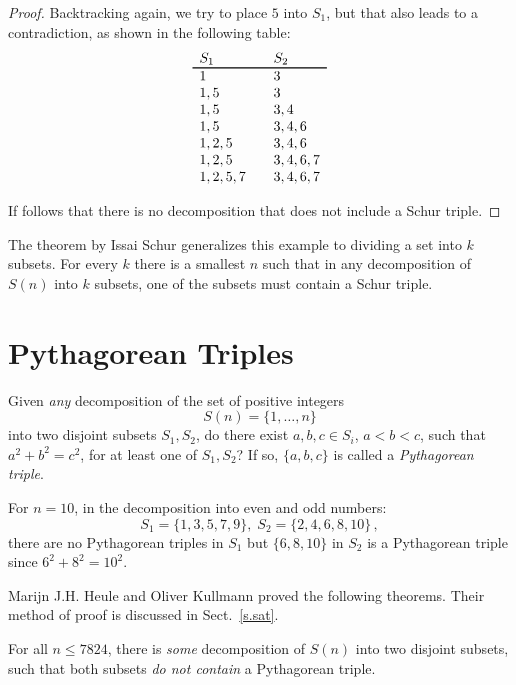 \begin{proof}
Backtracking again, we try to place $5$ into $S_1$, but that also leads to a contradiction, as shown in the following table:
\[
\begin{array}{l@{\hspace{2em}}l}
S_1&S_2\\\svhline
1&3\\
1,5& 3\\
1,5&3,4\\
1,5&3,4,6\\
1,2,5&3,4,6\\
1,2,5&3,4,6,7\\
1,2,5,7&3,4,6,7
\end{array}
\]

If follows that there is no decomposition that does not include a Schur triple.
\end{proof}

The theorem by Issai Schur generalizes this example to dividing a set into $k$ subsets. For every $k$ there is a smallest $n$ such that in any decomposition of $S(n)$ into $k$ subsets, one of the subsets must contain a Schur triple.


\section{Pythagorean Triples}\label{s.pyth}

\begin{definition}
Given \emph{any} decomposition of the set of positive integers
\[S(n)=\{1,\ldots,n\}\]
into two disjoint subsets $S_1,S_2$, do there exist $a,b,c\in S_i$, $a\!<\!b\!<\!c$, such that $a^2+b^2=c^2$, for at least one of $S_1,S_2$? If so, $\{a,b,c\}$ is called a \emph{Pythagorean triple}.
\end{definition}

\begin{example}
For $n=10$, in the decomposition into even and odd numbers:
\[
S_1 = \{1,3,5,7,9\},\; S_2=\{2,4,6,8,10\}\,,
\]
there are no Pythagorean triples in $S_1$ but $\{6,8,10\}$ in $S_2$ is a Pythagorean triple since $6^2+8^2=10^2$.
\end{example}

Marijn J.H. Heule and Oliver Kullmann proved the following theorems. Their method of proof is discussed in Sect.~\ref{s.sat}.

\begin{theorem}
For all $n\leq 7824$, there is \emph{some} decomposition of $S(n)$ into two disjoint subsets, such that both subsets \emph{do not contain} a Pythagorean triple.
\end{theorem}

